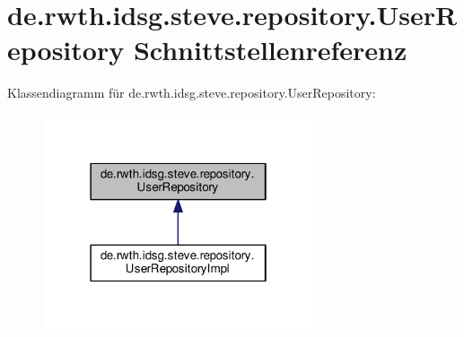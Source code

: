 \hypertarget{interfacede_1_1rwth_1_1idsg_1_1steve_1_1repository_1_1_user_repository}{\section{de.\-rwth.\-idsg.\-steve.\-repository.\-User\-Repository Schnittstellenreferenz}
\label{interfacede_1_1rwth_1_1idsg_1_1steve_1_1repository_1_1_user_repository}
}


Klassendiagramm für de.\-rwth.\-idsg.\-steve.\-repository.\-User\-Repository\-:
\nopagebreak
\begin{figure}[H]
\begin{center}
\leavevmode
\includegraphics[width=226pt]{interfacede_1_1rwth_1_1idsg_1_1steve_1_1repository_1_1_user_repository__inherit__graph}
\end{center}
\end{figure}
